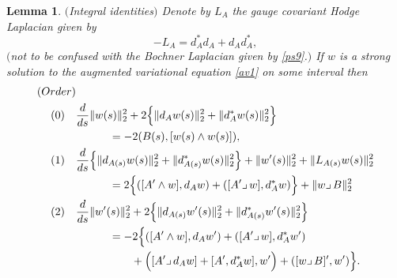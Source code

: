 \documentclass[12pt]{article}
\newtheorem{lemma}[theorem]{Lemma}
\def \beq{\begin{equation}}
\def \eeq{\end{equation}}
\def \eref{\eqref}
\def \lrc{\lrcorner\,}
\numberwithin{equation}{section}
\begin{document}
    
 \begin{lemma}\label{lemintid2} $($Integral identities$)$ 
 Denote by $L_A$ the gauge covariant Hodge Laplacian  given by
 \beq
-L_A  = d_A^*d_A +d_A d_A^*,                 \label{intid40}
\eeq
$($not to be confused with the Bochner Laplacian given by \eref{ps9}.$)$ 
  If $w$ is a strong solution to the
  augmented variational  equation \eref{av1} on some interval then     
  \begin{align}   
(Order)& \notag\\    
 (0)  \ \ \ & \frac{d}{ds} \|  w(s) \|_2^2 
                    +2\Big\{ \| d_A  w(s) \| _2^2   + \| d_A^*  w(s) \| _2^2\Big\} \notag \\
         &     \ \ \ \ \ \ \ \ \                       = -2(B(s), [w(s)\wedge w(s)] ),   \label{intid35} \\
 (1)  \ \ \       &\frac{d}{ds}\Big\{ \| d_{A(s)} w(s) \|_2^2 + \| d_{A(s)}^* w(s) \|_2^2\Big\}
  + \| w'(s)\|_2^2 + \| L_{A(s)} 
            w(s)\|_2^2                                                     \notag\\
        &\ \ \ \ \ \ \ \ \ = 2\Big\{ ([A'\wedge w], d_A w) + ( [A'\lrc w], d_A^* w)\Big\} 
                                                                                + \|w\lrc B\|_2^2                  \label{intid36} \\ 
(2)  \ \ \   &\frac{d}{ds} \| w'(s) \|_2^2 
+2\Big\{ \|d_{A(s)} w'(s) \|_2^2  + \|d_{A(s)}^* w'(s) \|_2^2  \Big\}                 \notag\\
&\ \ \ \ \ \ \ \ \ = -2\Big\{ ([A'\wedge w],d_A w') + ([A'\lrc w],d_A^* w')     \notag \\
&\ \ \ \ \ \ \ \ \ \ \ \ \ \ \ +\Big([A'\lrc d_A w] +[A', d_A^* w], w'\Big) + ([w\lrc B]', w')\Big\}. \label{intid38}
       \end{align}    
\end{lemma}     
\end{document}
